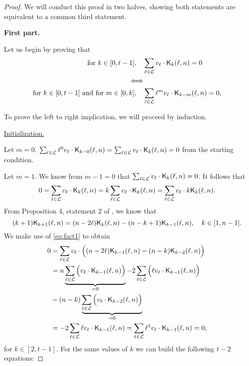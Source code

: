 \begin{proof}
    We will conduct this proof in two halves, showing both statements are equivalent to a common third statement.

    \textbf{First part.}

    Let us begin by proving that
    \begin{equation*}
        \begin{split}
            \text{for } k \in [0, t-1], \quad &\sum_{\ell \in \mathcal{L}} v_\ell \cdot \mathsf{K}_{k}(\ell,n) = 0\\
            \Longleftrightarrow\\
            \text{for } k \in [0, t-1] \text{ and for } m \in [0, k], \quad &\sum_{\ell \in \mathcal{L}} \ell^mv_\ell \cdot \mathsf{K}_{k-m}(\ell,n) = 0,
        \end{split}
    \end{equation*}

    To prove the left to right implication, we will proceed by induction.

    \underline{Initialization.}

    Let $m = 0$. $\sum_{\ell \in \mathcal{L}} \ell^0v_\ell \cdot \mathsf{K}_{k-0}(\ell,n) = \sum_{\ell \in \mathcal{L}} v_\ell \cdot \mathsf{K}_{k}(\ell,n) = 0$ from the starting condition.

    Let $m = 1$. We know from $m - 1 = 0$ that $\sum_{\ell \in \mathcal{L}} v_\ell \cdot \mathsf{K}_{k}(\ell,n) = 0$. It follows that
    $$
    0 = \sum_{\ell \in \mathcal{L}} v_\ell \cdot \mathsf{K}_{k}(\ell,n) = k\sum_{\ell \in \mathcal{L}} v_\ell \cdot \mathsf{K}_{k}(\ell,n) = \sum_{\ell \in \mathcal{L}} v_\ell \cdot k\mathsf{K}_{k}(\ell,n).
    $$
    From Proposition 4, statement 2 of \cite{DCC:DalMaiSar06}, we know that
    \begin{equation}\label{eq:fact1}
        (k+1)\mathsf{K}_{k+1}(\ell,n) = (n-2\ell)\mathsf{K}_{k}(\ell,n) - (n-k+1)\mathsf{K}_{k-1}(\ell,n), \quad k \in [1, n-1].
    \end{equation}
    We make use of \cref{eq:fact1} to obtain
    \begin{equation*}
    \begin{split}
        0 &= \sum_{\ell \in \mathcal{L}} v_\ell \cdot \Big( (n - 2\ell)\mathsf{K}_{k-1}(\ell,n) - (n - k)\mathsf{K}_{k-2}(\ell,n) \Big)\\
        & = n \underbrace{\sum_{\ell \in \mathcal{L}} \Big( v_\ell \cdot \mathsf{K}_{k-1}(\ell,n) \Big)}_{=0} - 2\sum_{\ell \in \mathcal{L}} \Big( \ell v_\ell \cdot \mathsf{K}_{k-1}(\ell,n) \Big)\\& - (n-k)\underbrace{\sum_{\ell \in \mathcal{L}} \Big( v_\ell \cdot \mathsf{K}_{k-2}(\ell,n) \Big)}_{=0}\\
        &= -2\sum_{\ell \in \mathcal{L}} \ell v_\ell \cdot \mathsf{K}_{k-1}(\ell,n) = \sum_{\ell \in \mathcal{L}} \ell^1v_\ell \cdot \mathsf{K}_{k-1}(\ell,n) = 0,
    \end{split}
    \end{equation*}
    for $k \in [2, t-1]$. For the same values of $k$ we can build the following $t-2$ equations:


\end{proof}
